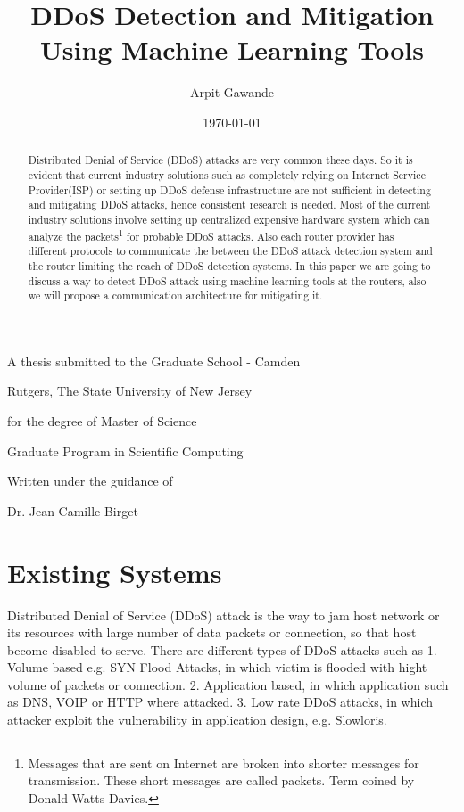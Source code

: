 \documentclass[10pt,oneside,a4paper]{article}
\title{DDoS Detection and Mitigation Using Machine Learning Tools}
\author{Arpit Gawande}
\date{\today}
\begin{document}
\maketitle


\begin{center}
\vfill
A thesis submitted to the Graduate School - Camden \par
Rutgers, The State University of New Jersey \par
\vspace{1cm}
for the degree of Master of Science \par
\vspace{1cm}
Graduate Program in Scientific Computing \par
\vspace{1cm}
Written under the guidance of \par
Dr. Jean-Camille Birget
\vfill
\end{center}

\pagebreak

\begin{abstract}
Distributed Denial of Service (DDoS) attacks are very common these days\cite{ddosattacknews}. So it is evident that current industry solutions such as completely relying on Internet Service Provider(ISP) or setting up DDoS defense infrastructure are not sufficient in detecting and mitigating DDoS attacks, hence consistent research is needed. Most of the current industry solutions involve setting up centralized expensive hardware system which can analyze the packets\footnote{Messages that are sent on Internet are broken into shorter messages for transmission. These short messages are called packets. Term coined by Donald Watts Davies.} \cite{networkdatapacket} for probable DDoS attacks. Also each router provider has different protocols to communicate the between the DDoS attack detection system and the router limiting the reach of DDoS detection systems. In this paper we are going to discuss a way to detect DDoS attack using machine learning tools at the routers, also we will propose a communication architecture for mitigating it.
\end{abstract}

\section{Existing Systems}

Distributed Denial of Service (DDoS) attack is the way to jam host network or its resources with large number of data packets or connection, so that host become disabled to serve. There are different types of DDoS attacks such as
1. Volume based e.g. SYN Flood Attacks, in which victim is flooded with hight volume of packets or connection.
2. Application based, in which application such as DNS, VOIP or HTTP where attacked.
3. Low rate DDoS attacks, in which attacker exploit the vulnerability in application design, e.g. Slowloris.
\cite{DDoSAttacks}
\end{document}
